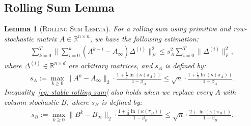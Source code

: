 \documentclass{article}
\newtheorem{lemma}[thm]{Lemma}
\newcommand{\RR}{\mathbb{R}}
\newcommand{\norm}[1]{\| #1 \|}
\begin{document}
\subsection{Rolling Sum Lemma}
\begin{lemma}[\scshape Rolling Sum Lemma]\label{lem: rolling sum}
    For a rolling sum using primitive and row-stochastic matrix $A\in\RR^{n\times n}$, we have the following estimation:
    \begin{align} \label{eq: stable rolling sum}\sum_{k=0}^T\norm{\sum_{i=0}^k(A^{k-i}-A_\infty)\Delta^{(i)}}_F^2\le s_A^2\sum_{i=0}^T\norm{\Delta^{(i)}}_F^2,
    \end{align}
    where $\Delta^{(i)}\in \RR^{n\times d}$ are arbitrary matrices, and $s_A$ is defined by: 
    \begin{align}\label{eq: s_A definition}
        s_A:= \max_{k\ge 0}\norm{A^k-A_\infty}_2\cdot\frac{1+\frac{1}{2}\ln(\kappa(\pi_A))}{1-\beta_A}\le \sqrt{n}\cdot\frac{1+\frac{1}{2}\ln(\kappa(\pi_A))}{1-\beta_A}.
    \end{align} Inequality~\eqref{eq: stable rolling sum} also holds when we replace every $A$ with column-stochastic $B$, where $s_B$ is defined by:
    \begin{align}\label{eq: s_B definition}
        s_B:= \max_{k\ge 0}\norm{B^k-B_\infty}_2\cdot\frac{1+\frac{1}{2}\ln(\kappa(\pi_B))}{1-\beta_B}\le \sqrt{n}\cdot\frac{2+\ln(\kappa(\pi_B))}{1-\beta_B}.
    \end{align}
\end{lemma}
\end{document}
